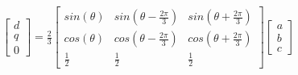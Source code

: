 \begin{gather}
\label{eq:park}
    \begin{bmatrix}
    d\\ q \\ 0
    \end{bmatrix}
    =
    \frac{2}{3}
    \begin{bmatrix}
    sin(\theta) & sin(\theta-\frac{2\pi}{3}) & sin(\theta+\frac{2\pi}{3}) \\[0.5em]
    cos(\theta) & cos(\theta-\frac{2\pi}{3}) & cos(\theta+\frac{2\pi}{3}) \\[0.5em]
    \frac{1}{2} & \frac{1}{2}                & \frac{1}{2}
    \end{bmatrix}
    \begin{bmatrix}
    a \\ b \\ c
    \end{bmatrix}
\end{gather}